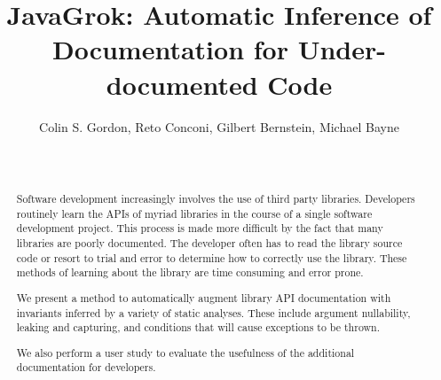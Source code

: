 \documentclass[letterpaper]{acm_proc_article-sp}
\begin{document}
\lstset{
	language=Java,
	numbers=left,
	tabsize=2,
	showstringspaces=false,
	basicstyle=\ttfamily\small
}

\title{JavaGrok: Automatic Inference of Documentation for Under-documented Code}

\author{
\alignauthor
Colin S. Gordon, Reto Conconi, Gilbert Bernstein, Michael Bayne\\
       \\
       \\
}

\maketitle
\begin{abstract}
Software development increasingly involves the use of third party
libraries. Developers routinely learn the APIs of myriad
libraries in the course of a single software development project. This process
is made more difficult by the fact that many libraries are poorly documented.
The developer often has to read the library source code or resort to trial and
error to determine how to correctly use the library. These methods of learning
about the library are time consuming and error prone.

We present a method to automatically augment library API documentation with
invariants inferred by a variety of static analyses. These include argument
nullability, leaking and capturing, and conditions that will cause exceptions
to be thrown.

We also perform a user study to
evaluate the usefulness of the additional documentation for developers.
\end{abstract}



\end{document}
